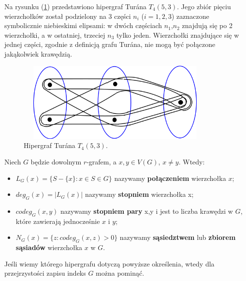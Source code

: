 \documentclass[miz,woman]{mgrwms}
\begin{document}
\begin{przy}
Na rysunku (\ref{hTuran}) przedstawiono hipergraf Tur\'ana $T_4(5,3)$. Jego zbiór pięciu wierzchołków został podzielony na 
3 części $n_i$ ($i=1,2,3$) zaznaczone symbolicznie niebieskimi elipsami: w dwóch częściach $n_1$,$n_2$ znajdują się po 2 wierzchołki, 
a w ostatniej, trzeciej $n_3$ tylko jeden. Wierzchołki znajdujące się w jednej części, zgodnie z definicją grafu Tur\'ana, 
nie mogą być połączone jakąkolwiek krawędzią.
\begin{figure}[h]
\centering
\includegraphics[width=10cm, height=4cm]{hTuran.png}
   \caption{Hipergraf Tur\'ana $T_4(5,3)$.}
    \label{hTuran}
\end{figure}
\end{przy}
\begin{defi}
 Niech $G$ będzie dowolnym $r$-grafem, a $x,y\in V(G)$, $x \not =y$. Wtedy:\\
\begin{itemize}
 \item$L_G(x)=\{S-\{x\} : x \in S\in G\}$ nazywamy \textbf{połączeniem} wierzchołka $x$;\\
 \item$deg_G(x)=|L_G(x)|$ nazywamy \textbf{stopniem} wierzchołka x;\\
 \item$codeg_G(x,y)$ nazywamy \textbf{stopniem pary} x,y i jest to liczba krawędzi w $G$, które zawierają jednocześnie $x$ i $y$;\\
 \item$N_G(x)=\{z:codeg_G(x,z)>0\}$ nazywamy \textbf{sąsiedztwem} lub \textbf{zbiorem sąsiadów} wierzchołka $x$ w $G$.
\end{itemize}
\end{defi}
Jeśli wiemy którego hipergrafu dotyczą powyższe określenia, wtedy dla przejrzystości zapisu indeks $G$ można pominąć.
\end{document}
